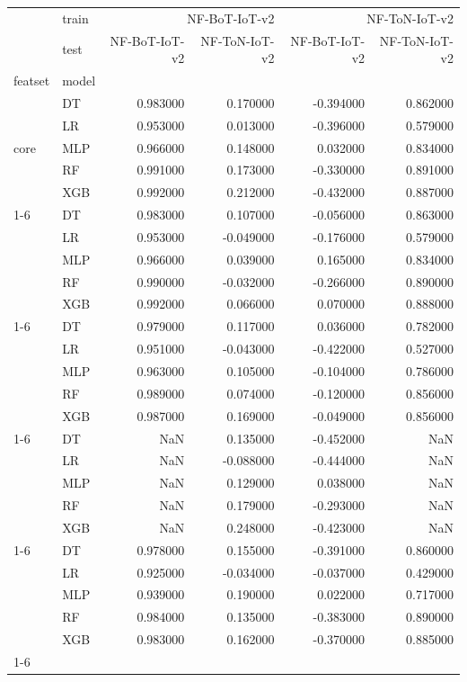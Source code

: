 \begin{tabular}{llrrrr}
\toprule
 & train & \multicolumn{2}{r}{NF-BoT-IoT-v2} & \multicolumn{2}{r}{NF-ToN-IoT-v2} \\
 & test & NF-BoT-IoT-v2 & NF-ToN-IoT-v2 & NF-BoT-IoT-v2 & NF-ToN-IoT-v2 \\
featset & model &  &  &  &  \\
\midrule
\multirow[t]{5}{*}{core} & DT & 0.983000 & 0.170000 & -0.394000 & 0.862000 \\
 & LR & 0.953000 & 0.013000 & -0.396000 & 0.579000 \\
 & MLP & 0.966000 & 0.148000 & 0.032000 & 0.834000 \\
 & RF & 0.991000 & 0.173000 & -0.330000 & 0.891000 \\
 & XGB & 0.992000 & 0.212000 & -0.432000 & 0.887000 \\
\cline{1-6}
\multirow[t]{5}{*}{core_dn} & DT & 0.983000 & 0.107000 & -0.056000 & 0.863000 \\
 & LR & 0.953000 & -0.049000 & -0.176000 & 0.579000 \\
 & MLP & 0.966000 & 0.039000 & 0.165000 & 0.834000 \\
 & RF & 0.990000 & -0.032000 & -0.266000 & 0.890000 \\
 & XGB & 0.992000 & 0.066000 & 0.070000 & 0.888000 \\
\cline{1-6}
\multirow[t]{5}{*}{core_noart} & DT & 0.979000 & 0.117000 & 0.036000 & 0.782000 \\
 & LR & 0.951000 & -0.043000 & -0.422000 & 0.527000 \\
 & MLP & 0.963000 & 0.105000 & -0.104000 & 0.786000 \\
 & RF & 0.989000 & 0.074000 & -0.120000 & 0.856000 \\
 & XGB & 0.987000 & 0.169000 & -0.049000 & 0.856000 \\
\cline{1-6}
\multirow[t]{5}{*}{shift_filter} & DT & NaN & 0.135000 & -0.452000 & NaN \\
 & LR & NaN & -0.088000 & -0.444000 & NaN \\
 & MLP & NaN & 0.129000 & 0.038000 & NaN \\
 & RF & NaN & 0.179000 & -0.293000 & NaN \\
 & XGB & NaN & 0.248000 & -0.423000 & NaN \\
\cline{1-6}
\multirow[t]{5}{*}{stable_subset} & DT & 0.978000 & 0.155000 & -0.391000 & 0.860000 \\
 & LR & 0.925000 & -0.034000 & -0.037000 & 0.429000 \\
 & MLP & 0.939000 & 0.190000 & 0.022000 & 0.717000 \\
 & RF & 0.984000 & 0.135000 & -0.383000 & 0.890000 \\
 & XGB & 0.983000 & 0.162000 & -0.370000 & 0.885000 \\
\cline{1-6}
\bottomrule
\end{tabular}
